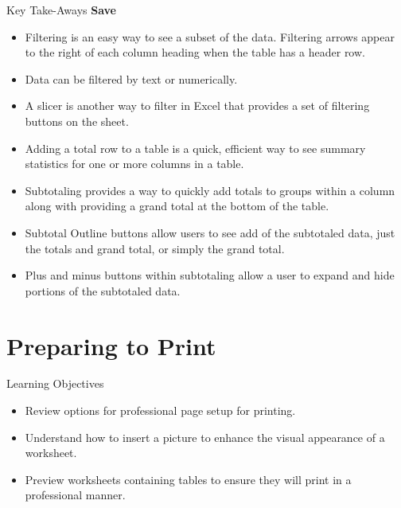 \begin{center}
	\begin{tkwbox}{Key Take-Aways}
		\textbf{Save}
		\\
		\begin{itemize}
			\setlength{\itemsep}{0pt}
			\setlength{\parskip}{0pt}
			\setlength{\parsep}{0pt}

			\item Filtering is an easy way to see a subset of the data. Filtering arrows appear to the right of each column heading when the table has a header row.
			\item Data can be filtered by text or numerically.
			\item A slicer is another way to filter in Excel that provides a set of filtering buttons on the sheet.
			\item Adding a total row to a table is a quick, efficient way to see summary statistics for one or more columns in a table.
			\item Subtotaling provides a way to quickly add totals to groups within a column along with providing a grand total at the bottom of the table.
			\item Subtotal Outline buttons allow users to see add of the subtotaled data, just the totals and grand total, or simply the grand total.
			\item Plus and minus buttons within subtotaling allow a user to expand and hide portions of the subtotaled data.
			
		\end{itemize}
	\end{tkwbox}
\end{center}

\section{Preparing to Print}

\begin{center}
	\begin{objbox}{Learning Objectives}
		\begin{itemize}
			\setlength{\itemsep}{0pt}
			\setlength{\parskip}{0pt}
			\setlength{\parsep}{0pt}

			\item Review options for professional page setup for printing.
			\item Understand how to insert a picture to enhance the visual appearance of a worksheet.
			\item Preview worksheets containing tables to ensure they will print in a professional manner.
			
		\end{itemize}
	\end{objbox}
\end{center}

